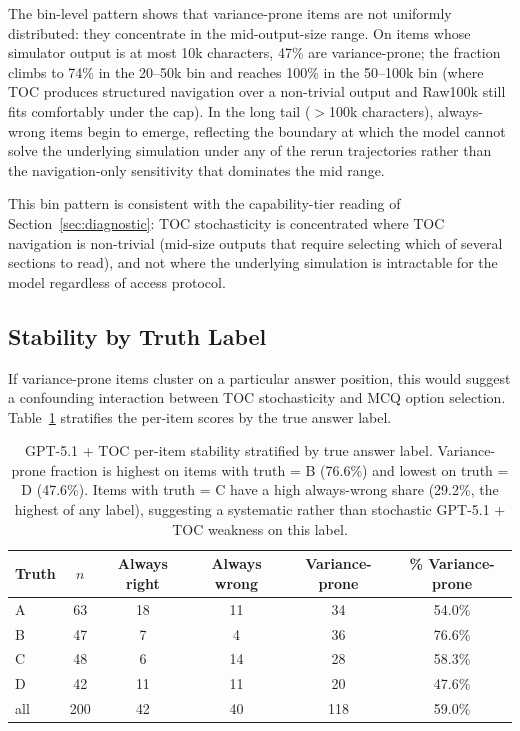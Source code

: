 \documentclass{article}
\begin{document}
The bin-level pattern shows that variance-prone items are not uniformly distributed: they concentrate in the mid-output-size range. On items whose simulator output is at most 10k characters, 47\% are variance-prone; the fraction climbs to 74\% in the 20--50k bin and reaches 100\% in the 50--100k bin (where TOC produces structured navigation over a non-trivial output and Raw100k still fits comfortably under the cap). In the long tail ($>$100k characters), always-wrong items begin to emerge, reflecting the boundary at which the model cannot solve the underlying simulation under any of the rerun trajectories rather than the navigation-only sensitivity that dominates the mid range.

This bin pattern is consistent with the capability-tier reading of Section~\ref{sec:diagnostic}: TOC stochasticity is concentrated where TOC navigation is non-trivial (mid-size outputs that require selecting which of several sections to read), and not where the underlying simulation is intractable for the model regardless of access protocol.

\subsection{Stability by Truth Label}

If variance-prone items cluster on a particular answer position, this would suggest a confounding interaction between TOC stochasticity and MCQ option selection. Table~\ref{tab:appendix-stability-by-label} stratifies the per-item scores by the true answer label.

\begin{table}[h]
\centering
\small
\setlength{\tabcolsep}{8pt}
\caption{GPT-5.1 + TOC per-item stability stratified by true answer label. Variance-prone fraction is highest on items with truth = B (76.6\%) and lowest on truth = D (47.6\%). Items with truth = C have a high always-wrong share (29.2\%, the highest of any label), suggesting a systematic rather than stochastic GPT-5.1 + TOC weakness on this label.}
\label{tab:appendix-stability-by-label}
\begin{tabular}{lccccc}
\toprule
Truth & $n$ & Always right & Always wrong & Variance-prone & \% Variance-prone \\
\midrule
A & 63 & 18 & 11 & 34 & 54.0\% \\
B & 47 & 7 & 4 & 36 & 76.6\% \\
C & 48 & 6 & 14 & 28 & 58.3\% \\
D & 42 & 11 & 11 & 20 & 47.6\% \\
\midrule
all & 200 & 42 & 40 & 118 & 59.0\% \\
\bottomrule
\end{tabular}
\end{table}
\end{document}
